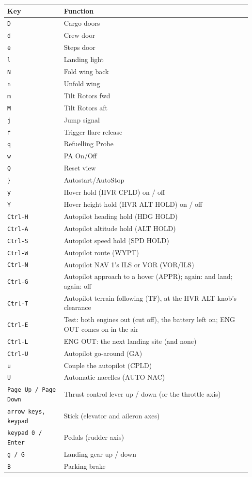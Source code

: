 \begin{tabular}{@{}lp{}@{}}
\toprule
Key & Function \\
\midrule
\texttt{D} & Cargo doors \\
\texttt{d} & Crew door \\
\texttt{e} & Steps door \\
\texttt{l} & Landing light \\
\texttt{N} & Fold wing back \\
\texttt{n} & Unfold wing \\
\texttt{m} & Tilt Rotors fwd \\
\texttt{M} & Tilt Rotors aft \\
\texttt{j} & Jump signal \\
\texttt{f} & Trigger flare release \\
\texttt{q} & Refuelling Probe \\
\texttt{w} & PA On/Off \\
\texttt{Q} & Reset view \\
\texttt{\}} & Autostart/AutoStop \\
\texttt{y} & Hover hold (HVR CPLD) on / off \\
\texttt{Y} & Hover height hold (HVR ALT HOLD) on / off \\
\texttt{Ctrl-H} & Autopilot heading hold (HDG HOLD) \\
\texttt{Ctrl-A} & Autopilot altitude hold (ALT HOLD) \\
\texttt{Ctrl-S} & Autopilot speed hold (SPD HOLD) \\
\texttt{Ctrl-W} & Autopilot route (WYPT) \\
\texttt{Ctrl-N} & Autopilot NAV 1's ILS or VOR (VOR/ILS) \\
\texttt{Ctrl-G} & Autopilot approach to a hover (APPR); again: and land; again: off \\
\texttt{Ctrl-T} & Autopilot terrain following (TF), at the HVR ALT knob's clearance \\
\texttt{Ctrl-E} & Test: both engines out (cut off), the battery left on; ENG OUT comes on in the air \\
\texttt{Ctrl-L} & ENG OUT: the next landing site (and none) \\
\texttt{Ctrl-U} & Autopilot go-around (GA) \\
\texttt{u} & Couple the autopilot (CPLD) \\
\texttt{U} & Automatic nacelles (AUTO NAC) \\
\texttt{Page Up / Page Down} & Thrust control lever up / down (or the throttle axis) \\
\texttt{arrow keys, keypad} & Stick (elevator and aileron axes) \\
\texttt{keypad 0 / Enter} & Pedals (rudder axis) \\
\texttt{g / G} & Landing gear up / down \\
\texttt{B} & Parking brake \\
\bottomrule
\end{tabular}

